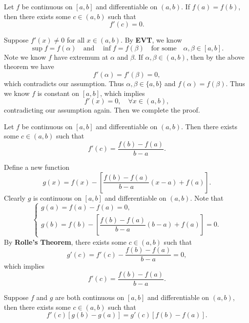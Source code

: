 	\begin{theoremenv}
		Let $f$ be continuous on $[a,b]$ and differentiable on $(a,b)$. If $f(a)=f(b)$, then there exists some $c\in (a,b)$ such that
		\[
		f'(c)=0.
		\]
		
	\end{theoremenv}
	\begin{proofenv}
		Suppose $f'(x)\neq 0$ for all $x\in (a,b)$. By \textbf{EVT}, we know
		\[
		\sup f = f(\alpha) \quad \text{and}\quad \inf f = f(\beta)\quad \text{for some}\quad \alpha, \beta \in [a,b].
		\]
		Note we know $f$ have extremum at $\alpha$ and $\beta$. If $\alpha, \beta \in (a,b)$, then by the above theorem we have
		\[
		f'(\alpha)=f'(\beta)=0,
		\]
		which contradicts our assumption. Thus $\alpha,\beta\in \{a,b\}$ and $f(\alpha)=f(\beta)$. Thus we know $f$ is constant on $[a,b]$, which implies
		\[
		f'(x)= 0,\quad \forall x\in (a,b),
		\]
		contradicting our assumption again. Then we complete the proof.
	\end{proofenv}
	\begin{theoremenv}
		Let $f$ be continuous on $[a,b]$ and differentiable on $(a,b)$. Then there exists some $c\in (a,b)$ such that
		\[
		f'(c)=\frac{f(b)-f(a)}{b-a}.
		\]
		
	\end{theoremenv}
	\begin{proofenv}
		Define a new function
		\[
		g(x) = f(x) - \left[ \frac{f(b)-f(a)}{b-a} (x - a) + f(a) \right].
		\]
		Clearly $g$ is continuous on $[a,b]$ and differentiable on $(a,b)$. Note that
		\[
		\begin{cases}
			g(a)=f(a)-f(a)=0 ,\\[6pt]
			g(b)=f(b)-\left[ \dfrac{f(b)-f(a)}{b-a} (b - a) + f(a) \right]=0.
		\end{cases}
		\]
		By \textbf{Rolle's Theorem}, there exists some $c\in (a,b)$ such that
		\[
		g'(c) = f'(c) - \frac{f(b)-f(a)}{b-a} = 0,
		\]
		which implies
		\[
		f'(c) = \frac{f(b)-f(a)}{b-a}.
		\]
	\end{proofenv}
	\begin{theoremenv}
		Suppose $f$ and $g$ are both continuous on $[a,b]$ and differentiable on $(a,b)$, then there exists some $c\in (a,b)$ such that
		\[
		f'(c)\left[ g(b)-g(a) \right] = g'(c) \left[ f(b)-f(a) \right].
		\]
		
	\end{theoremenv}
